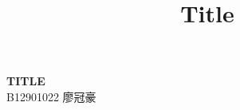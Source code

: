 \documentclass[11pt]{article}
\theoremstyle{definition}
\begin{document}
\setcounter{section}{0}
\title{Title}

\thispagestyle{empty}
\begin{center}
  {\large \bf TITLE} \\ 
  B12901022 廖冠豪
\end{center}
\end{document}

